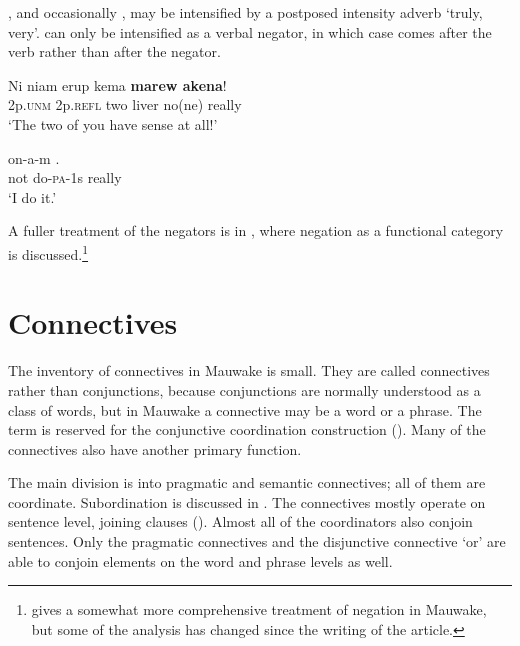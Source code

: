 \textstyleStyleVernacularWordsItalic{} ,  and occasionally , may be intensified by a postposed intensity adverb  `truly, very'.  can only be intensified as a verbal negator, in which case  comes after the verb rather than after the negator.

\ea%
\label{ex:3:x652}
\gll Ni niam erup kema\textbf{ marew akena}! \\
2p.\textsc{unm} 2p.\textsc{refl} two liver no(ne) really\\
\glt`The two of you have  sense at all!'
\z

\ea%
\label{ex:3:x653}
\gll {} on-a-m . \\
not do-\textsc{pa}-1s really\\
\glt`I  do it.'
\z

A fuller treatment of the negators is in , where negation as a functional category is discussed.\footnote{\citet{Berghall2006} gives a somewhat more comprehensive treatment of negation in Mauwake, but some of the analysis has changed since the writing of the article.}

\section{Connectives}\label{sec:3:11}
{}
The inventory of connectives in Mauwake is small. They are called connectives rather than conjunctions, because conjunctions are normally understood as a class of words, but in Mauwake a connective may be a word or a phrase. The term  is reserved for the conjunctive coordination construction (). Many of the connectives also have another primary function. 

The main division is into pragmatic and semantic connectives; all of them are coordinate. Subordination is discussed in . The connectives mostly operate on sentence level, joining clauses (). Almost all of the coordinators also conjoin sentences. Only the pragmatic connectives and the disjunctive connective  `or' are able to conjoin elements on the word and phrase levels as well. 

